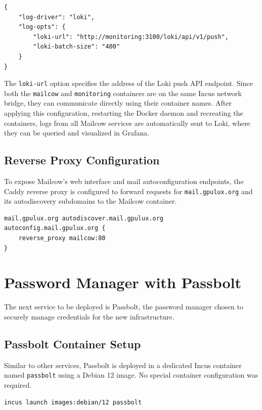 \begin{lstlisting}[caption={Docker daemon configuration to use the Loki logging driver.}]
{
    "log-driver": "loki",
    "log-opts": {
        "loki-url": "http://monitoring:3100/loki/api/v1/push",
        "loki-batch-size": "400"
    }
}
\end{lstlisting}

The \texttt{loki-url} option specifies the address of the Loki push API endpoint. Since both the \texttt{mailcow} and \texttt{monitoring} containers are on the same Incus network bridge, they can communicate directly using their container names. After applying this configuration, restarting the Docker daemon and recreating the containers, logs from all Mailcow services are automatically sent to Loki, where they can be queried and visualized in Grafana.

\subsection*{Reverse Proxy Configuration}

To expose Mailcow's web interface and mail autoconfiguration endpoints, the Caddy reverse proxy is configured to forward requests for \texttt{mail.gpulux.org} and its autodiscovery subdomains to the Mailcow container.

\begin{lstlisting}[caption={Caddyfile configuration to reverse proxy Mailcow.}]
mail.gpulux.org autodiscover.mail.gpulux.org autoconfig.mail.gpulux.org {
    reverse_proxy mailcow:80
}
\end{lstlisting}

\section{Password Manager with Passbolt}

The next service to be deployed is Passbolt, the password manager chosen to securely manage credentials for the new infrastructure.

\subsection*{Passbolt Container Setup}

Similar to other services, Passbolt is deployed in a dedicated Incus container named \texttt{passbolt} using a Debian 12 image. No special container configuration was required.

\begin{lstlisting}[language=bash,caption={Creating the Passbolt container.}]
incus launch images:debian/12 passbolt
\end{lstlisting}

